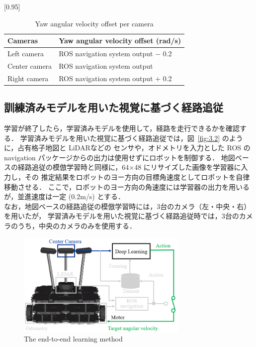 \documentclass{jarticle}
\renewcommand{\figurename}{図~}
\newcommand{\figref}[1]{\figurename\ref{#1}}
\begin{document}
\begin{table}[h!]
  \centering
  \caption{Yaw angular velocity offset per camera}
  \label{table:3.1}
    \scalebox{0.95}[0.95]{
    \begin{tabular}{|l|l|}
      \hline\hline
      Cameras & Yaw angular velocity offset (rad/s)\\
      \hline\hline
      Left camera & ROS navigation system output $-$ 0.2\\
      \hline
      Center camera & ROS navigation system output\\
      \hline
      Right camera & ROS navigation system output $+$ 0.2\\
      \hline
    \end{tabular} }
\end {table}




\subsection{訓練済みモデルを用いた視覚に基づく経路追従}
学習が終了したら，学習済みモデルを使用して，経路を走行できるかを確認する．
学習済みモデルを用いた視覚に基づく経路追従では，\figref{fig:3.2} のように，占有格子地図と LiDARなどの
センサや，オドメトリを入力とした ROS の navigation パッケージからの出力は使用せずにロボットを制御する．
地図ベースの経路追従の模倣学習時と同様に，64×48 にリサイズした画像を学習器に入力し，その
推定結果をロボットのヨー方向の目標角速度としてロボットを自律移動させる．
ここで，ロボットのヨー方向の角速度には学習器の出力を用いるが，並進速度は一定 (0.2m/s) とする．\\
\hspace*{1zw}なお，地図ベースの経路追従の模倣学習時には，3台のカメラ（左・中央・右）を用いたが，
学習済みモデルを用いた視覚に基づく経路追従時では，3台のカメラのうち，中央のカメラのみを使用する．\\

\begin{figure}[h!]
  \centering
   \includegraphics[height=50mm]{./png/afterlearn.png}
   \caption{The end-to-end learning method}
\end{figure}
\end{document}
